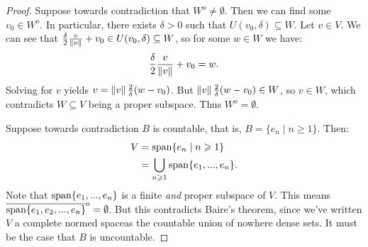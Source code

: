 \documentclass[11pt,twoside,openany]{memoir}
\begin{document}
        \begin{proof}
            Suppose towards contradiction that $W^o \neq \emptyset$. Then we can find some $v_0 \in W^o$. In particular, there exists $\delta > 0$ such that $U(v_0,\delta) \subseteq W$. Let $v \in V$. We can see that $\frac{\delta}{2}\frac{v}{\left\lVert v \right\rVert} +v_0 \in U(v_0,\delta) \subseteq W$, so for some $w \in W$ we have:
                \begin{equation*}
                \begin{split}
                    \frac{\delta}{2}\frac{v}{\left\lVert v \right\rVert} +v_0 = w.
                \end{split}
                \end{equation*}
            Solving for $v$ yields $v = \left\lVert v \right\rVert\frac{2}{\delta}(w - v_0)$. But $\left\lVert v \right\rVert\frac{2}{\delta}(w - v_0) \in W$, so $v \in W$, which contradicts $W \subseteq V$ being a proper subspace. Thus $W^o = \emptyset$.
            

            Suppose towards contradiction $B$ is countable, that is, $B = \{e_n \mid n \geq 1\}$. Then:
                \begin{equation*}
                \begin{split}
                    V
                    & = \operatorname{span} \{e_n \mid n \geqslant 1\} \\
                    & = \bigcup_{n \geqslant 1}\operatorname{span}\{e_1,...,e_n\}.
                \end{split}
                \end{equation*}
            Note that $\operatorname{span}\{e_1,...,e_n\}$ is a finite \textit{and} proper subspace of $V$. This means $\overline{\operatorname{span}\{e_1,e_2,...,e_n\}}^o = \emptyset$. But this contradicts Baire's theorem, since we've written $V$ \textemdash a complete normed space\textemdash as the countable union of nowhere dense sets. It must be the case that $B$ is uncountable.
        \end{proof}
\end{document}
